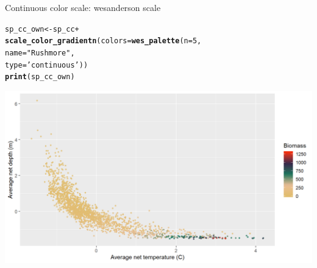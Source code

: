 \documentclass{beamer}\usepackage[]{graphicx}\usepackage[]{color}
\makeatletter
\newcommand{\hlnum}[1]{\textcolor[rgb]{0.686,0.059,0.569}{#1}}%
\newcommand{\hlstr}[1]{\textcolor[rgb]{0.192,0.494,0.8}{#1}}%
\newcommand{\hlopt}[1]{\textcolor[rgb]{0,0,0}{#1}}%
\newcommand{\hlstd}[1]{\textcolor[rgb]{0.345,0.345,0.345}{#1}}%
\newcommand{\hlkwb}[1]{\textcolor[rgb]{0.69,0.353,0.396}{#1}}%
\newcommand{\hlkwc}[1]{\textcolor[rgb]{0.333,0.667,0.333}{#1}}%
\newcommand{\hlkwd}[1]{\textcolor[rgb]{0.737,0.353,0.396}{\textbf{#1}}}%
\newenvironment{kframe}{%
 \def\at@end@of@kframe{}%
 \ifinner\ifhmode%
  \def\at@end@of@kframe{\end{minipage}}%
  \begin{minipage}{\columnwidth}%
 \fi\fi%
 \def\FrameCommand##1{\hskip\@totalleftmargin \hskip-\fboxsep
 \colorbox{shadecolor}{##1}\hskip-\fboxsep
     \hskip-\linewidth \hskip-\@totalleftmargin \hskip\columnwidth}%
 \MakeFramed {\advance\hsize-\width
   \@totalleftmargin\z@ \linewidth\hsize
   \@setminipage}}%
 {\par\unskip\endMakeFramed%
 \at@end@of@kframe}
\newenvironment{knitrout}{}{} %
\makeatother
\begin{document}
\begin{frame}[fragile]{Continuous color scale: wesanderson scale}
\begin{knitrout}\footnotesize
{}\color{fgcolor}\begin{kframe}
\begin{alltt}
\hlstd{sp_cc_own} \hlkwb{<-} \hlstd{sp_cc} \hlopt{+}
  \hlkwd{scale_color_gradientn}\hlstd{(}\hlkwc{colors} \hlstd{=} \hlkwd{wes_palette}\hlstd{(}\hlkwc{n}\hlstd{=}\hlnum{5}\hlstd{,}
                                             \hlkwc{name}\hlstd{=}\hlstr{"Rushmore"}\hlstd{,}
                                             \hlkwc{type} \hlstd{=} \hlstr{'continuous'}\hlstd{))}
\hlkwd{print}\hlstd{(sp_cc_own)}
\end{alltt}
\end{kframe}

{\centering \includegraphics[width=.9\linewidth]{figure/sp_continuous_color5-1} 

}



\end{knitrout}
\end{frame}
\end{document}
